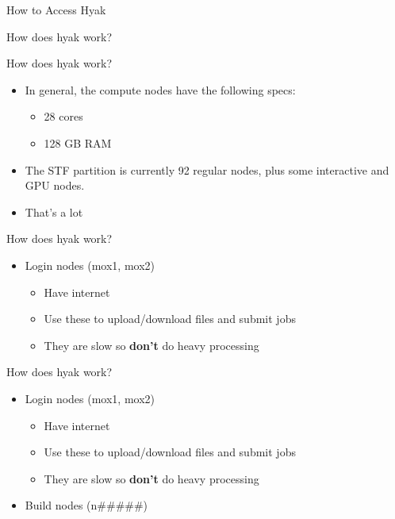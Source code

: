 \documentclass[ignorenonframetext,]{beamer}
\providecommand{\tightlist}{%
  \setlength{\itemsep}{0pt}\setlength{\parskip}{0pt}}
\begin{document}
\begin{frame}[fragile]{How to Access Hyak}
\begin{block}{How does hyak work?}
\end{block}

\begin{block}{How does hyak work?}

\begin{itemize}[<+->]
\item
  In general, the compute nodes have the following specs:

  \begin{itemize}[<+->]
  \item
    28 cores
  \item
    128 GB RAM
  \end{itemize}
\item
  The STF partition is currently 92 regular nodes, plus some interactive
  and GPU nodes.
\item
  That's a lot
\end{itemize}

\end{block}

\begin{block}{How does hyak work?}

\begin{itemize}[<+->]
\tightlist
\item
  Login nodes (mox1, mox2)

  \begin{itemize}[<+->]
  \tightlist
  \item
    Have internet
  \item
    Use these to upload/download files and submit jobs
  \item
    They are slow so \textbf{don't} do heavy processing
  \end{itemize}
\end{itemize}

\end{block}

\begin{block}{How does hyak work?}

\begin{itemize}[<+->]
\tightlist
\item
  Login nodes (mox1, mox2)

  \begin{itemize}[<+->]
  \tightlist
  \item
    Have internet
  \item
    Use these to upload/download files and submit jobs
  \item
    They are slow so \textbf{don't} do heavy processing
  \end{itemize}
\item
  Build nodes (n\#\#\#\#\#)


\end{itemize}
\end{block}
\end{frame}
\end{document}
